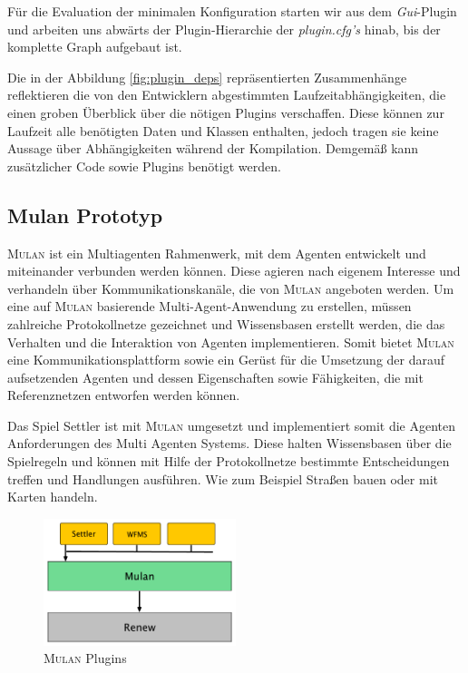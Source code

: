 		Für die Evaluation der minimalen Konfiguration starten wir aus dem \textit{Gui}-Plugin und arbeiten uns abwärts der Plugin-Hierarchie der \textit{plugin.cfg's} hinab, bis der komplette Graph aufgebaut ist. \newline

		Die in der Abbildung \ref{fig:plugin_deps} repräsentierten Zusammenhänge reflektieren die von den Entwicklern abgestimmten Laufzeitabhängigkeiten, die einen groben Überblick über die nötigen Plugins verschaffen. Diese können zur Laufzeit alle benötigten Daten und Klassen enthalten, jedoch tragen sie keine Aussage über Abhängigkeiten während der Kompilation. Demgemäß kann zusätzlicher Code sowie Plugins benötigt werden. 

	\subsection{Mulan Prototyp} \label{sub:mulan}
		\textsc{Mulan} \cite{Roelke04} ist ein Multiagenten Rahmenwerk, mit dem Agenten entwickelt und miteinander verbunden werden können. Diese agieren nach eigenem Interesse und verhandeln über Kommunikationskanäle, die von \textsc{Mulan} angeboten werden. Um eine auf \textsc{Mulan} basierende Multi-Agent-Anwendung zu erstellen, müssen zahlreiche Protokollnetze gezeichnet und Wissensbasen erstellt werden, die das Verhalten und die Interaktion von Agenten implementieren. Somit bietet \textsc{Mulan} eine Kommunikationsplattform sowie ein Gerüst für die Umsetzung der darauf aufsetzenden Agenten und dessen Eigenschaften sowie Fähigkeiten, die mit Referenznetzen entworfen werden können. \cite{Cabac10a} \bigbreak

		Das Spiel Settler ist mit \textsc{Mulan} umgesetzt und implementiert somit die Agenten Anforderungen des Multi Agenten Systems. Diese halten Wissensbasen über die Spielregeln und können mit Hilfe der Protokollnetze bestimmte Entscheidungen treffen und Handlungen ausführen. Wie zum Beispiel Straßen bauen oder mit Karten handeln.\bigbreak
		
		\begin{figure}[h!]
		  \centering
		  \includegraphics[width=0.5\textwidth]{material/images/settler-mulan-renew.pdf}
		  \caption{\textsc{Mulan} Plugins}
		  \label{fig:mulan_plugin}
		\end{figure}

